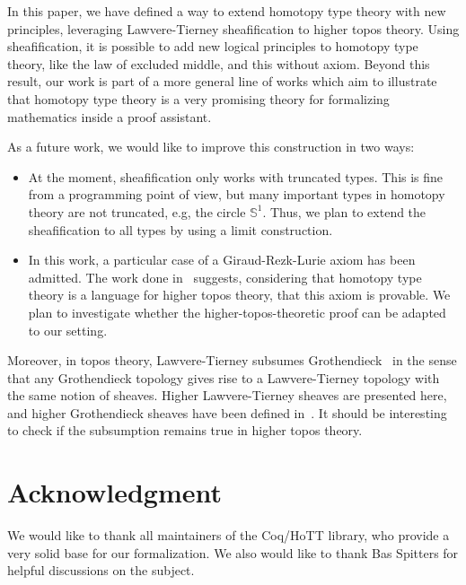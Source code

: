 \documentclass[conference]{IEEEtran}
\newcommand{\eg}{e.g,\xspace}
\begin{document}
In this paper, we have defined a way to extend homotopy type theory
with new principles, leveraging Lawvere-Tierney sheafification to
higher topos theory. 
%
Using sheafification, it is possible to add new logical principles to
homotopy type theory, like the law of excluded middle, and this
without axiom.
%
Beyond this result, our work is part of a more general line of works
which aim to illustrate that homotopy type theory is a very promising
theory for formalizing mathematics inside a proof assistant.


As a future work, we would like to improve this construction in two
ways:
\begin{itemize}
\item 
  At the moment, sheafification only works with truncated
  types. This is fine from a programming point of view, 
  but many important types in homotopy theory are not
  truncated, \eg the circle $\mathbb S^1$.  Thus, we plan to extend
  the sheafification to all types by using a
  limit construction.
\item 
  In this work, a particular case of a Giraud-Rezk-Lurie axiom has
  been admitted. The work done in~\cite[Chapter 6]{lurie} suggests,
  considering that homotopy type theory is a language for higher topos
  theory, that this axiom is provable. We plan to investigate whether the
  higher-topos-theoretic proof can be adapted to our setting.
\end{itemize}
Moreover, in topos theory, Lawvere-Tierney subsumes Grothendieck~\cite[Section~V.4]{maclanemoerdijk} in the sense that any
Grothendieck topology gives rise to a Lawvere-Tierney topology with
the same notion of sheaves. Higher Lawvere-Tierney sheaves are
presented here, and higher Grothendieck sheaves have been defined
in~\cite{lurie}. It should be interesting to check if the subsumption
remains true in higher topos theory.







\section*{Acknowledgment}

We would like to thank all maintainers of the Coq/HoTT library, who
provide a very solid base for our formalization. We also would like
to thank Bas Spitters for helpful discussions on the subject.
\end{document}
